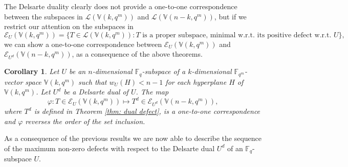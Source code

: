 \documentclass[11pt]{amsart}
\newtheorem{corollary}[theorem]{Corollary}
\newcommand{\fqm}{\mathbb{F}_{q^m}}
\newcommand{\fq}{{\mathbb F}_{q}}
\begin{document}
The Delsarte duality clearly does not provide a one-to-one correspondence between the subspaces in 
$\mathcal{L}(\mathbb{V}(k,q^m))$ and  $\mathcal{L}(\mathbb{V}(n-k,q^m))$, but if we restrict our attention on the subspaces in  
\[ \mathcal{E}_U(\mathbb{V}(k,q^m))=\{ T \in \mathcal{L}(\mathbb{V}(k,q^m)) \colon T \text{ is a proper subspace, minimal w.r.t. its positive defect w.r.t. }U \}, \]
we can show a one-to-one correspondence between $\mathcal{E}_U(\mathbb{V}(k,q^m))$ and $\mathcal{E}_{U^d}(\mathbb{V}(n-k,q^m))$, as a consequence of the above theorems. 

\begin{corollary}
    Let $U$ be an $n$-dimensional $\fq$-subspace of a $k$-dimensional $\fqm$-vector space $\mathbb{V}(k,q^m)$ such that $w_{{U}}(H)< n-1$ for each hyperplane $H$  of $\mathbb{V}(k,q^m)$. Let $U^d$ be a Delsarte dual of $U$. 
    The map
    \[ \varphi \colon T \in \mathcal{E}_U(\mathbb{V}(k,q^m)) \mapsto T^d \in \mathcal{E}_{U^d}(\mathbb{V}(n-k,q^m)), \]
    where $T^d$ is defined in Theorem \ref{thm: dual defect}, is a one-to-one correspondence and $\varphi$ reverses the order of the set inclusion.
\end{corollary}



As a consequence of the previous results we are now able to describe the sequence of the maximum non-zero defects with respect to the Delsarte dual $U^d$ of an $\fq$-subspace $U$.  
\end{document}
